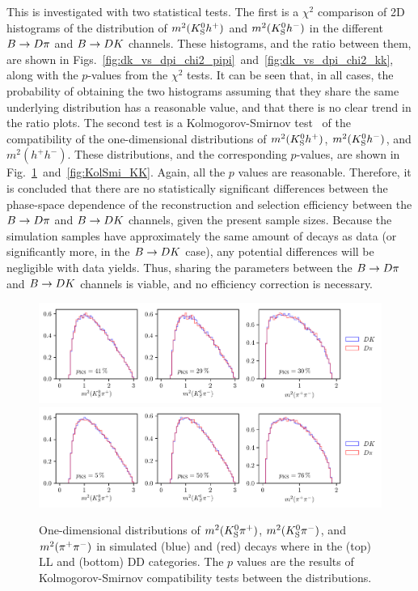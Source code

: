 This is investigated with two statistical tests. The first is a $\chi^2$ comparison of 2D histograms of the distribution of $m^2({{K}^0_{\mathrm{S}}} h^+)$ and $m^2({{K}^0_{\mathrm{S}}} h^-)$ in the different ${B}\rightarrow{\ensuremath{D}}\pi$ and ${B}\rightarrow{\ensuremath{D}}{\ensuremath{K}}$ channels. These histograms, and the ratio between them, are shown in Figs.~\ref{fig:dk_vs_dpi_chi2_pipi}~and~\ref{fig:dk_vs_dpi_chi2_kk}, along with the $p$-values from the $\chi^2$ tests. It can be seen that, in all cases, the probability of obtaining the two histograms assuming that they share the same underlying distribution has a reasonable value, and that there is no clear trend in the ratio plots. The second test is a Kolmogorov-Smirnov test~\cite{kolmogorovSullaDeterminazioneEmpirica1933,*smirnovTableEstimatingGoodness1948} of the compatibility of the one-dimensional distributions of $m^2({{K}^0_{\mathrm{S}}} h^+)$, $m^2({{K}^0_{\mathrm{S}}} h^-)$, and $m^2(h^+ h^-)$. These distributions, and the corresponding $p$-values, are shown in Fig.~\ref{fig:KolSmi_PiPi}~and~\ref{fig:KolSmi_KK}. Again, all the $p$ values are reasonable. Therefore, it is concluded that there are no statistically significant differences between the phase-space dependence of the reconstruction and selection efficiency between the ${B}\rightarrow{\ensuremath{D}}\pi$ and ${B}\rightarrow{\ensuremath{D}}{\ensuremath{K}}$ channels, given the present sample sizes. Because the simulation samples have approximately the same amount of decays as data (or significantly more, in the ${B}\rightarrow{\ensuremath{D}}{\ensuremath{K}}$ case), any potential differences will be negligible with data yields. Thus, sharing the \Fi parameters between the ${B}\rightarrow{\ensuremath{D}}\pi$ and ${B}\rightarrow{\ensuremath{D}}{\ensuremath{K}}$ channels is viable, and no efficiency correction is necessary. 

\begin{figure}[tbp]
    \centering
    \includegraphics[width=\columnwidth]{figures/analysis/DP_thesis_s_KolSmi_PiPi_LL.pdf}
    \includegraphics[width=\columnwidth]{figures/analysis/DP_thesis_s_KolSmi_PiPi_DD.pdf}
    \caption{One-dimensional distributions of $m^2({{K}^0_{\mathrm{S}}}{{\pi}^+})$, $m^2({{K}^0_{\mathrm{S}}}{{\pi}^-})$, and $m^2({{\pi}^+}{{\pi}^-})$ in simulated (blue) \BtoDK and (red) \BtoDpi  decays where \DtoKspipi in the (top) LL and (bottom) DD categories. The $p$ values are the results of Kolmogorov-Smirnov compatibility tests between the distributions.}
    \label{fig:KolSmi_PiPi}
\end{figure}

